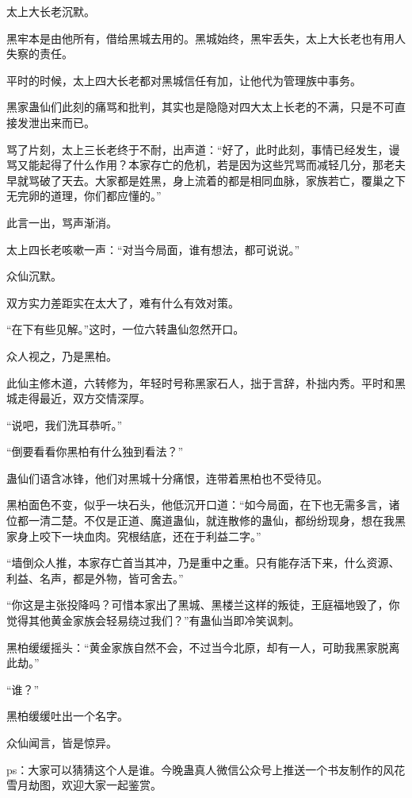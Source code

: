 \begin{this_body}
太上大长老沉默。

黑牢本是由他所有，借给黑城去用的。黑城始终，黑牢丢失，太上大长老也有用人失察的责任。

平时的时候，太上四大长老都对黑城信任有加，让他代为管理族中事务。

黑家蛊仙们此刻的痛骂和批判，其实也是隐隐对四大太上长老的不满，只是不可直接发泄出来而已。

骂了片刻，太上三长老终于不耐，出声道：“好了，此时此刻，事情已经发生，谩骂又能起得了什么作用？本家存亡的危机，若是因为这些咒骂而减轻几分，那老夫早就骂破了天去。大家都是姓黑，身上流着的都是相同血脉，家族若亡，覆巢之下无完卵的道理，你们都应懂的。”

此言一出，骂声渐消。

太上四长老咳嗽一声：“对当今局面，谁有想法，都可说说。”

众仙沉默。

双方实力差距实在太大了，难有什么有效对策。

“在下有些见解。”这时，一位六转蛊仙忽然开口。

众人视之，乃是黑柏。

此仙主修木道，六转修为，年轻时号称黑家石人，拙于言辞，朴拙内秀。平时和黑城走得最近，双方交情深厚。

“说吧，我们洗耳恭听。”

“倒要看看你黑柏有什么独到看法？”

蛊仙们语含冰锋，他们对黑城十分痛恨，连带着黑柏也不受待见。

黑柏面色不变，似乎一块石头，他低沉开口道：“如今局面，在下也无需多言，诸位都一清二楚。不仅是正道、魔道蛊仙，就连散修的蛊仙，都纷纷现身，想在我黑家身上咬下一块血肉。究根结底，还在于利益二字。”

“墙倒众人推，本家存亡首当其冲，乃是重中之重。只有能存活下来，什么资源、利益、名声，都是外物，皆可舍去。”

“你这是主张投降吗？可惜本家出了黑城、黑楼兰这样的叛徒，王庭福地毁了，你觉得其他黄金家族会轻易绕过我们？”有蛊仙当即冷笑讽刺。

黑柏缓缓摇头：“黄金家族自然不会，不过当今北原，却有一人，可助我黑家脱离此劫。”

“谁？”

黑柏缓缓吐出一个名字。

众仙闻言，皆是惊异。

ps：大家可以猜猜这个人是谁。今晚蛊真人微信公众号上推送一个书友制作的风花雪月劫图，欢迎大家一起鉴赏。

\end{this_body}

